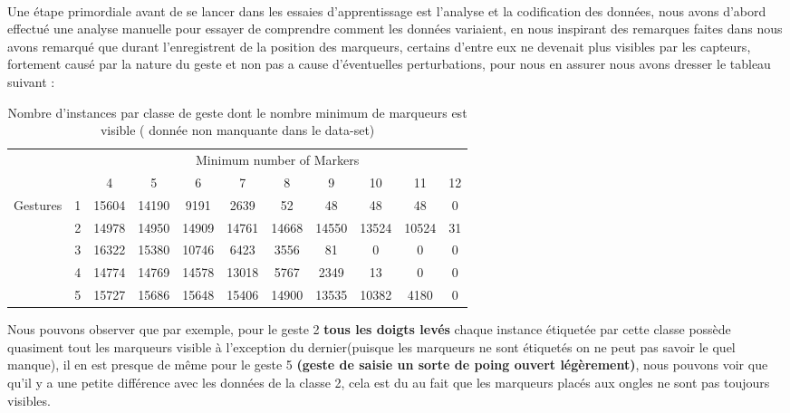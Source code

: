 \paragraph{}
Une étape primordiale avant de se lancer dans les essaies d'apprentissage est l'analyse et la codification des données, nous avons d'abord effectué une analyse manuelle pour essayer de comprendre comment les données variaient, en nous inspirant des remarques faites dans \cite{datasetDetails} nous avons remarqué que durant l'enregistrent de la position des marqueurs, certains d'entre eux ne devenait plus visibles par les capteurs, fortement causé par la nature du geste et non pas a cause d'éventuelles perturbations, pour nous en assurer nous avons dresser le tableau suivant : 
\begin{table}[H]
	\centering
	\begin{tabular}{cc|c|c|c|c|c|c|c|c|c|}
		\cline{3-11}
		&           & \multicolumn{9}{c|}{Minimum number of Markers}                     \\ \cline{3-11} 
		& \textbf{}     & 4     & 5     & 6     & 7     & 8     & 9     & 10    & 11 & 12\\ \hline
		\multicolumn{1}{|c|}{\multirow{5}{*}{Gestures}} & 1         & 15604 & 14190 & 9191  & 2639  & 52    & 48    & 48    & 48    & 0  \\ \cline{2-11} 
		\multicolumn{1}{|c|}{}                          & 2         & 14978 & 14950 & 14909 & 14761 & 14668 & 14550 & 13524 & 10524 & 31 \\ \cline{2-11} 
		\multicolumn{1}{|c|}{}                          & 3         & 16322 & 15380 & 10746 & 6423  & 3556  & 81    & 0     & 0     & 0  \\ \cline{2-11} 
		\multicolumn{1}{|c|}{}                          & 4         & 14774 & 14769 & 14578 & 13018 & 5767  & 2349  & 13    & 0     & 0  \\ \cline{2-11} 
		\multicolumn{1}{|c|}{}                          & 5         & 15727 & 15686 & 15648 & 15406 & 14900 & 13535 & 10382 & 4180  & 0  \\ \hline
	\end{tabular}
	\caption{Nombre d'instances par classe de geste dont le nombre minimum de marqueurs est visible ( donnée non manquante dans le data-set)}
	\label{my-label}
\end{table}
\par 
Nous pouvons observer que par exemple, pour le geste 2 \textbf{tous les doigts levés} chaque instance étiquetée par cette classe possède quasiment 
tout les marqueurs visible à l'exception du dernier(puisque les marqueurs ne sont étiquetés on ne peut pas savoir le quel manque), il en est presque de même pour le geste 5 \textbf{(geste de saisie un sorte de poing ouvert légèrement)}, nous pouvons voir que qu'il y a une petite différence avec les données de la classe 2, cela est du au fait que les marqueurs placés aux ongles ne sont pas toujours visibles.\par 
